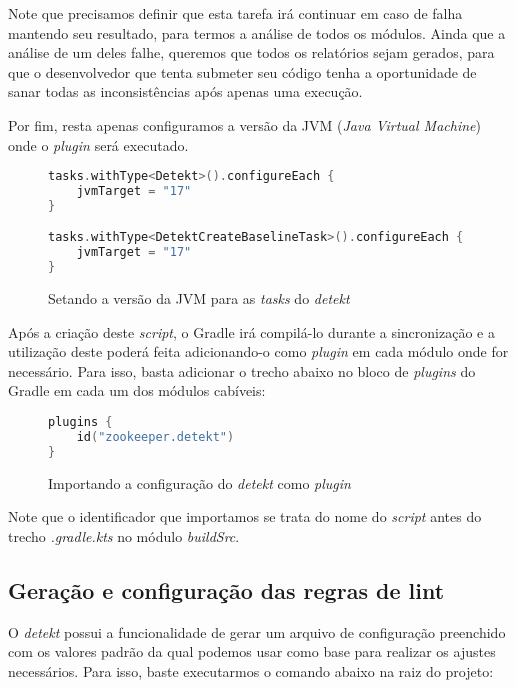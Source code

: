Note que precisamos definir que esta tarefa irá continuar em caso de falha mantendo seu resultado, para termos a análise de todos os módulos. Ainda que a análise de um deles falhe, queremos que todos os relatórios sejam gerados, para que o desenvolvedor que tenta submeter seu código tenha a oportunidade de sanar todas as inconsistências após apenas uma execução.

Por fim, resta apenas configuramos a versão da JVM (\textit{Java Virtual Machine}) onde o \textit{plugin} será executado.

\begin{figure}[H]
    \begin{lstlisting}[language=Kotlin,numbers = none,numbers = none]
tasks.withType<Detekt>().configureEach {
    jvmTarget = "17"
}

tasks.withType<DetektCreateBaselineTask>().configureEach {
    jvmTarget = "17"
}
    \end{lstlisting}
    \caption{Setando a versão da JVM para as \textit{tasks} do \textit{detekt}}
    \label{fig:set_jvm_version}
\end{figure}

Após a criação deste \textit{script}, o Gradle irá compilá-lo durante a sincronização e a utilização deste poderá feita adicionando-o como \textit{plugin} em cada módulo onde for necessário. Para isso, basta adicionar o trecho abaixo no bloco de \textit{plugins} do Gradle em cada um dos módulos cabíveis:

\begin{figure}[H]
    \begin{lstlisting}[language=Kotlin,numbers = none]
plugins {
    id("zookeeper.detekt")
}
    \end{lstlisting}
    \caption{Importando a configuração do \textit{detekt} como \textit{plugin}}
    \label{fig:importing_detekt_config}
\end{figure}

Note que o identificador que importamos se trata do nome do \textit{script} antes do trecho \textit{.gradle.kts} no módulo \textit{buildSrc}.

\subsection{Geração e configuração das regras de lint}

O \textit{detekt} possui a funcionalidade de gerar um arquivo de configuração preenchido com os valores padrão da qual podemos usar como base para realizar os ajustes necessários. Para isso, baste executarmos o comando abaixo na raiz do projeto:

